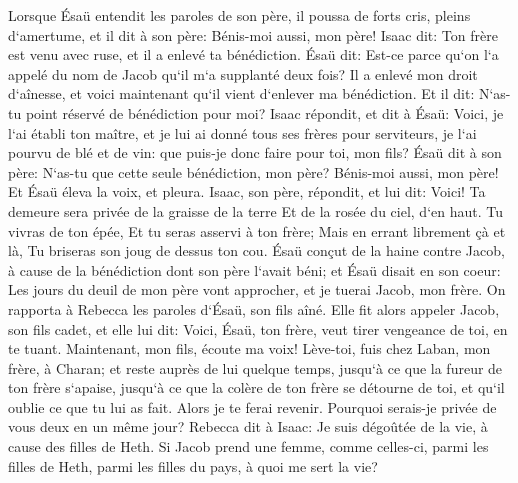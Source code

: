 \verse Lorsque Ésaü entendit les paroles de son père, il poussa de forts cris, pleins d`amertume, et il dit à son père: Bénis-moi aussi, mon père! 
\verse Isaac dit: Ton frère est venu avec ruse, et il a enlevé ta bénédiction. 
\verse Ésaü dit: Est-ce parce qu`on l`a appelé du nom de Jacob qu`il m`a supplanté deux fois? Il a enlevé mon droit d`aînesse, et voici maintenant qu`il vient d`enlever ma bénédiction. Et il dit: N`as-tu point réservé de bénédiction pour moi? 
\verse Isaac répondit, et dit à Ésaü: Voici, je l`ai établi ton maître, et je lui ai donné tous ses frères pour serviteurs, je l`ai pourvu de blé et de vin: que puis-je donc faire pour toi, mon fils? 
\verse Ésaü dit à son père: N`as-tu que cette seule bénédiction, mon père? Bénis-moi aussi, mon père! Et Ésaü éleva la voix, et pleura. 
\verse Isaac, son père, répondit, et lui dit: Voici! Ta demeure sera privée de la graisse de la terre Et de la rosée du ciel, d`en haut. 
\verse Tu vivras de ton épée, Et tu seras asservi à ton frère; Mais en errant librement çà et là, Tu briseras son joug de dessus ton cou. 
\verse Ésaü conçut de la haine contre Jacob, à cause de la bénédiction dont son père l`avait béni; et Ésaü disait en son coeur: Les jours du deuil de mon père vont approcher, et je tuerai Jacob, mon frère. 
\verse On rapporta à Rebecca les paroles d`Ésaü, son fils aîné. Elle fit alors appeler Jacob, son fils cadet, et elle lui dit: Voici, Ésaü, ton frère, veut tirer vengeance de toi, en te tuant. 
\verse Maintenant, mon fils, écoute ma voix! Lève-toi, fuis chez Laban, mon frère, à Charan; 
\verse et reste auprès de lui quelque temps, 
\verse jusqu`à ce que la fureur de ton frère s`apaise, jusqu`à ce que la colère de ton frère se détourne de toi, et qu`il oublie ce que tu lui as fait. Alors je te ferai revenir. Pourquoi serais-je privée de vous deux en un même jour? 
\verse Rebecca dit à Isaac: Je suis dégoûtée de la vie, à cause des filles de Heth. Si Jacob prend une femme, comme celles-ci, parmi les filles de Heth, parmi les filles du pays, à quoi me sert la vie? 

